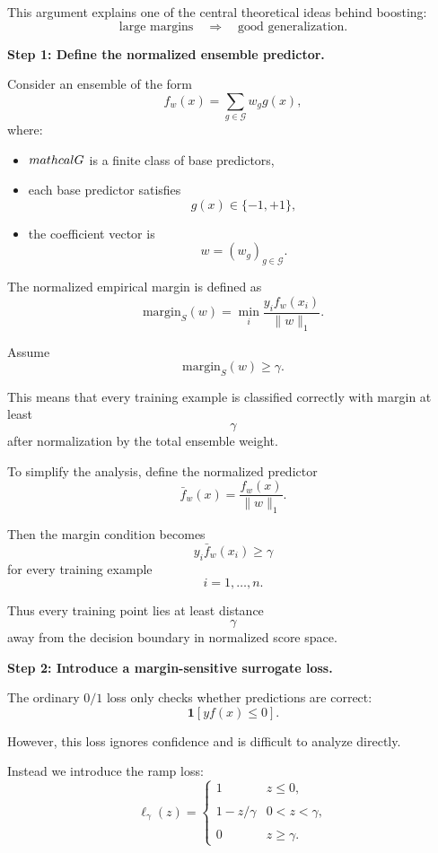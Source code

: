 \documentclass[11pt]{article}
\newcommand{\ind}{\mathbf{1}}
\begin{document}
\begin{enumerate}
\begin{solutionbox}
This argument explains one of the central theoretical ideas behind boosting:
\[
\text{large margins}
\quad\Longrightarrow\quad
\text{good generalization}.
\]

\medskip

\textbf{Step 1: Define the normalized ensemble predictor.}

Consider an ensemble of the form
\[
f_w(x)
=
\sum_{g\in\mathcal G}
w_gg(x),
\]
where:
\begin{itemize}
    \item $\\mathcal G$ is a finite class of base predictors,
    \item each base predictor satisfies
    \[
    g(x)\in\{-1,+1\},
    \]
    \item the coefficient vector is
    \[
    w=(w_g)_{g\in\mathcal G}.
    \]
\end{itemize}

The normalized empirical margin is defined as
\[
\mathrm{margin}_S(w)
=
\min_i
\frac{
y_if_w(x_i)
}{
\|w\|_1
}.
\]

Assume
\[
\mathrm{margin}_S(w)\ge\gamma.
\]

This means that every training example is classified correctly with margin at least
\[
\gamma
\]
after normalization by the total ensemble weight.

To simplify the analysis, define the normalized predictor
\[
\bar f_w(x)
=
\frac{
f_w(x)
}{
\|w\|_1
}.
\]

Then the margin condition becomes
\[
y_i\bar f_w(x_i)\ge\gamma
\]
for every training example
\[
i=1,\ldots,n.
\]

Thus every training point lies at least distance
\[
\gamma
\]
away from the decision boundary in normalized score space.

\medskip

\textbf{Step 2: Introduce a margin-sensitive surrogate loss.}

The ordinary $0/1$ loss only checks whether predictions are correct:
\[
\ind[yf(x)\le0].
\]

However, this loss ignores confidence and is difficult to analyze directly.

Instead we introduce the ramp loss:
\[
\ell_\gamma(z)
=
\begin{cases}
1 & z\le0,\\\\
1-z/\gamma & 0<z<\gamma,\\\\
0 & z\ge\gamma.
\end{cases}
\]


\end{solutionbox}
\end{enumerate}
\end{document}
